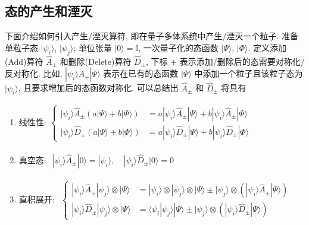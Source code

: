 \documentclass[../../main.tex]{subfiles}
\begin{document}
\subsection{态的产生和湮灭}
下面介绍如何引入产生/湮灭算符, 即在量子多体系统中产生/湮灭一个粒子. 准备单粒子态 $|\psi_{i}\rangle$, $|\psi_{j}\rangle$; 单位张量 $|0\rangle = \mathbb{I}$, 一次量子化的态函数 $|\Psi\rangle$, $|\Phi\rangle$. 定义添加(Add)算符 $\hat{A}_{\pm}$ 和删除(Delete)算符 $\hat{D}_{\pm}$, 下标 $\pm$ 表示添加/删除后的态需要对称化/反对称化. 比如, $|\psi_{i}\rangle\hat{A}_{+}|\Psi\rangle$ 表示在已有的态函数 $|\Psi\rangle$ 中添加一个粒子且该粒子态为 $|\psi_{i}\rangle$, 且要求增加后的态函数对称化. 可以总结出 $\hat{A}_{\pm}$ 和 $\hat{D}_{\pm}$ 将具有
\begin{enumerate}
  \item 线性性:$\begin{aligned}\left\{\begin{aligned}
    |\psi_{i}\rangle\hat{A}_{\pm}(a|\Psi\rangle + b|\Phi\rangle) &= a|\psi_{i}\rangle\hat{A}_{\pm}|\Psi\rangle + b|\psi_{i}\rangle\hat{A}_{\pm}|\Phi\rangle\\
    |\psi_{i}\rangle\hat{D}_{\pm}(a|\Psi\rangle + b|\Phi\rangle) &= a|\psi_{i}\rangle\hat{D}_{\pm}|\Psi\rangle + b|\psi_{i}\rangle\hat{D}_{\pm}|\Phi\rangle
  \end{aligned}\right.
  \end{aligned}$
  \item 真空态: $\begin{aligned}
    |\psi_{i}\rangle\hat{A}_{\pm}|0\rangle = |\psi_{i}\rangle, \quad |\psi_{i}\rangle\hat{D}_{\pm}|0\rangle = 0
  \end{aligned}$
  \item 直积展开: $\begin{aligned}\left\{\begin{aligned}
    |\psi_{i}\rangle\hat{A}_{\pm}|\psi_{j}\rangle\otimes|\Psi\rangle &= |\psi_{i}\rangle\otimes|\psi_{j}\rangle\otimes|\Psi\rangle\pm |\psi_{j}\rangle\otimes (|\psi_{i}\rangle\hat{A}_{\pm}|\Psi\rangle) \\
    |\psi_{i}\rangle\hat{D}_{\pm}|\psi_{j}\rangle\otimes|\Psi\rangle &= \langle\psi_{i}|\psi_{j}\rangle|\Psi\rangle\pm |\psi_{j}\rangle\otimes (|\psi_{i}\rangle\hat{D}_{\pm}|\Psi\rangle)
  \end{aligned}\right.
  \end{aligned}$
\end{enumerate}
\end{document}

